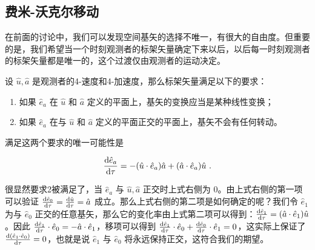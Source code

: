 \subsection{费米-沃克尔移动}
在前面的讨论中，我们可以发现空间基矢的选择不唯一，有很大的自由度。但重要的是，我们希望当一个时刻观测者的标架矢量确定下来以后，以后每一时刻观测者的标架矢量都是唯一的，这个过渡仅由观测者的运动决定。

设 $\hat{u},\hat{a}$ 是观测者的4-速度和4-加速度，那么标架矢量满足以下的要求：
\begin{enumerate}
\item 如果 $\hat{e}_a$ 在 $\hat u$ 和 $\hat a$ 定义的平面上，基矢的变换应当是某种线性变换；
\item 如果 $\hat{e}_a$ 在与 $\hat u$ 和 $\hat a$ 定义的平面正交的平面上，基矢不会有任何转动。
\end{enumerate}

满足这两个要求的唯一可能性是

\begin{equation}
\begin{aligned}
\frac{{\rm d} \hat{e}_a}{{\rm d} \tau}=-(\hat u\cdot\hat{e}_a)\hat a+ (\hat a\cdot \hat{e}_a)\hat u~.
\end{aligned}
\end{equation}

很显然要求2被满足了，当 $\hat{e}_a$ 与 $\hat u,\hat a$ 正交时上式右侧为 0。由上式右侧的第一项可以验证 $\frac{{\rm d}\hat{e}_0}{{\rm d}\tau}=\frac{{\rm d}\hat u}{{\rm d}\tau}=\hat a$ 成立。那么上式右侧的第二项是如何确定的呢？我们令 $\hat{e}_1$ 为与 $\hat{e}_0$ 正交的任意基矢，那么它的变化率由上式第二项可以得到：$\frac{{\rm d}\hat{e}_1}{{\rm d}\tau}=(\hat a\cdot \hat{e}_1)\hat u$。因此 $\frac{{\rm d}\hat{e}_1}{{\rm d}\tau}\cdot \hat{e}_0=-\hat a\cdot \hat{e}_1$，移项可以得到 $\frac{{\rm d}\hat{e}_1}{{\rm d}\tau}\cdot \hat{e}_0+ \frac{{\rm d}\hat{e}_0}{{\rm d}\tau} \cdot \hat{e}_1=0$，这实际上保证了 $\frac{{\rm d} (\hat{e}_1\cdot \hat{e}_0)}{{\rm d}\tau}=0$，也就是说 $\hat{e}_1$ 与 $\hat{e}_0$ 将永远保持正交，这符合我们的期望。
